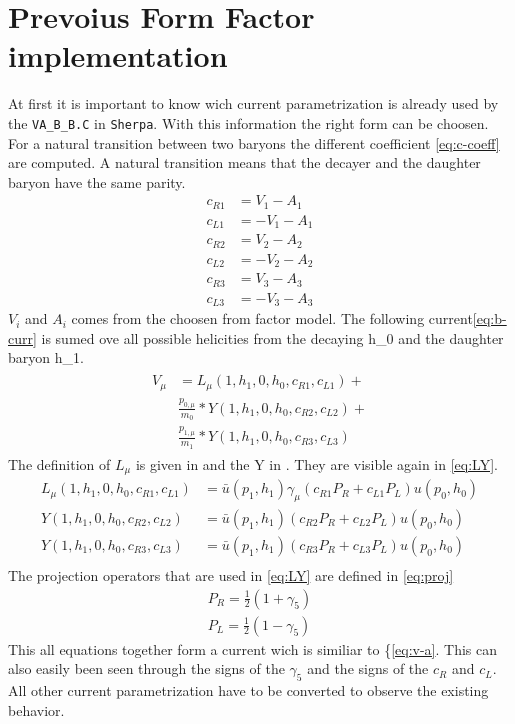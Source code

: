 \section{Prevoius Form Factor implementation}
At first it is important to know wich current parametrization is already used 
by the \texttt{VA\_B\_B.C} in \texttt{Sherpa}. With this information the right 
form can be choosen.
For a natural transition between two baryons the different coefficient
{\eqref{eq:c-coeff}} are computed. A natural transition means that the decayer 
and the daughter baryon have the same parity.
\begin{align}
  c_{R1} & = V_1 - A_1 \nonumber \\
  c_{L1} & = -V_1 - A_1 \nonumber \\
  c_{R2} & = V_2 - A_2 \nonumber \\
  c_{L2} & = -V_2 - A_2 \nonumber \\
  c_{R3} & = V_3 - A_3 \nonumber \\
  c_{L3} & = -V_3 - A_3 \label{eq:c-coeff}
\end{align}
\(V_i\) and \(A_i\) comes from the choosen from factor model. The following 
current{\eqref{eq:b-curr}} is sumed ove all possible helicities from the 
decaying h\_0 and the daughter baryon h\_1.
\begin{align}
\begin{split}
  V_\mu &= L_\mu(1, h_1, 0, h_0, c_{R1}, c_{L1}) + \\
        & \frac{p_{0, \mu}}{m_0} * Y(1, h_1, 0, h_0, c_{R2}, c_{L2}) + \\
        & \frac{p_{1, \mu}}{m_1} * Y(1, h_1, 0, h_0, c_{R3}, c_{L3}) \label{eq:b-curr}
\end{split}
\end{align}
The definition of \(L_\mu\) is given in \cite[Eq. A.96]{diploma} and the Y in 
\cite[Eq. A.94]{diploma}. They are visible again in {\eqref{eq:LY}}.
\begin{align}
  L_\mu(1, h_1, 0, h_0, c_{R1}, c_{L1}) & = \bar{u}(p_1, h_1)\gamma_\mu \left( c_{R1} P_R + c_{L1} P_L \right) u(p_0, h_0) \nonumber \\
  Y(1, h_1, 0, h_0, c_{R2}, c_{L2}) & = \bar{u}(p_1, h_1) \left( c_{R2} P_R + c_{L2} P_L \right) u(p_0, h_0) \nonumber \\
  Y(1, h_1, 0, h_0, c_{R3}, c_{L3}) & = \bar{u}(p_1, h_1) \left( c_{R3} P_R + c_{L3} P_L \right) u(p_0, h_0) \nonumber \\
\end{align}
The projection operators that are used in {\eqref{eq:LY}} are defined in {\eqref{eq:proj}}
\begin{align}
  P_R = \frac{1}{2} \left( 1 + \gamma_5 \right) \nonumber \\
  P_L = \frac{1}{2} \left( 1 - \gamma_5 \right) \label{eq:proj}
\end{align}
This all equations together form a current wich is similiar to {\{\eqref{eq:v-a}}.
This can also easily been seen through the signs of the \(\gamma_5\) and the 
signs of the \(c_R\) and \(c_L\).
All other current parametrization have to be converted to observe the 
existing behavior.

